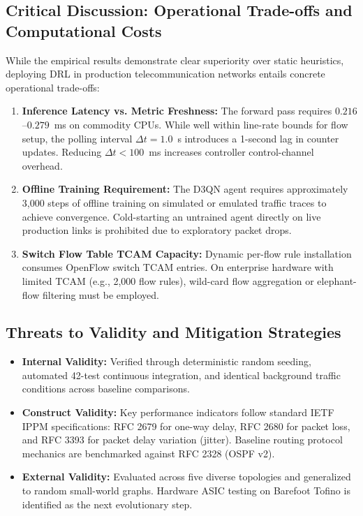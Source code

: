 \documentclass[12pt,a4paper,oneside]{report}
\begin{document}
\subsection{Critical Discussion: Operational Trade-offs and Computational Costs}
While the empirical results demonstrate clear superiority over static heuristics, deploying DRL in production telecommunication networks entails concrete operational trade-offs:
\begin{enumerate}
    \item \textbf{Inference Latency vs. Metric Freshness:} The forward pass requires $0.216$--$0.279$~ms on commodity CPUs. While well within line-rate bounds for flow setup, the polling interval $\Delta t = 1.0$~s introduces a 1-second lag in counter updates. Reducing $\Delta t < 100$~ms increases controller control-channel overhead.
    \item \textbf{Offline Training Requirement:} The D3QN agent requires approximately 3,000 steps of offline training on simulated or emulated traffic traces to achieve convergence. Cold-starting an untrained agent directly on live production links is prohibited due to exploratory packet drops.
    \item \textbf{Switch Flow Table TCAM Capacity:} Dynamic per-flow rule installation consumes OpenFlow switch TCAM entries. On enterprise hardware with limited TCAM (e.g., 2,000 flow rules), wild-card flow aggregation or elephant-flow filtering must be employed.
\end{enumerate}

\subsection{Threats to Validity and Mitigation Strategies}
\begin{itemize}
    \item \textbf{Internal Validity:} Verified through deterministic random seeding, automated 42-test continuous integration, and identical background traffic conditions across baseline comparisons.
    \item \textbf{Construct Validity:} Key performance indicators follow standard IETF IPPM specifications: RFC 2679 for one-way delay, RFC 2680 for packet loss, and RFC 3393 for packet delay variation (jitter). Baseline routing protocol mechanics are benchmarked against RFC 2328 (OSPF v2).
    \item \textbf{External Validity:} Evaluated across five diverse topologies and generalized to random small-world graphs. Hardware ASIC testing on Barefoot Tofino is identified as the next evolutionary step.
\end{itemize}
\end{document}
